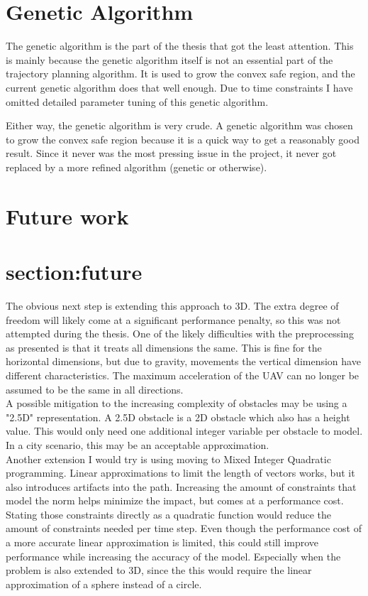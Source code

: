 \section{Genetic Algorithm}
The genetic algorithm is the part of the thesis that got the least attention. This is mainly because the genetic algorithm itself is not an essential part of the trajectory planning algorithm. It is used to grow the convex safe region, and the current genetic algorithm does that well enough. Due to time constraints I have omitted detailed parameter tuning of this genetic algorithm.
\par
Either way, the genetic algorithm is very crude. A genetic algorithm was chosen to grow the convex safe region because it is a quick way to get a reasonably good result.  Since it never was the most pressing issue in the project, it never got replaced by a more refined algorithm (genetic or otherwise). 

\section{Future work}
\section{section:future}
The obvious next step is extending this approach to 3D. The extra degree of freedom will likely come at a significant performance penalty, so this was not attempted during the thesis. One of the likely difficulties with the preprocessing as presented is that it treats all dimensions the same. This is fine for the horizontal dimensions, but due to gravity, movements the vertical dimension have different characteristics. The maximum acceleration of the UAV can no longer be assumed to be the same in all directions.\\
A possible mitigation to the increasing complexity of obstacles may be using a "2.5D" representation. A 2.5D obstacle is a 2D obstacle which also has a height value. This would only need one additional integer variable per obstacle to model. In a city scenario, this may be an acceptable approximation. \\

Another extension I would try is using moving to Mixed Integer Quadratic programming. Linear approximations to limit the length of vectors works, but it also introduces artifacts into the path. Increasing the amount of constraints that model the norm helps minimize the impact, but comes at a performance cost. Stating those constraints directly as a quadratic function would reduce the amount of constraints needed per time step. Even though the performance cost of a more accurate linear approximation is limited, this could still improve performance while increasing the accuracy of the model. Especially when the problem is also extended to 3D, since the this would require the linear approximation of a sphere instead of a circle. \\

